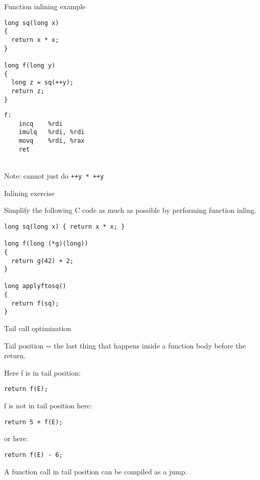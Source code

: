 \documentclass[landscape]{beamer}
\begin{document}
\begin{frame}[fragile]{Function inlining example}
\begin{minipage}{.5\textwidth}
\begin{verbatim}
long sq(long x)
{
  return x * x;
}

long f(long y)
{
  long z = sq(++y);
  return z;
}
\end{verbatim}
\end{minipage}
%
\begin{minipage}{.4\textwidth}
\begin{verbatim}
f:                   
	incq	%rdi
	imulq	%rdi, %rdi
	movq	%rdi, %rax
	ret
\end{verbatim}
\end{minipage}
\\[2em]

Note: cannot just do \texttt{++y * ++y}
\end{frame}

\begin{frame}[fragile]{Inlining exercise}

Simplify the following C code as much as possible by performing function inling.

\begin{verbatim}
long sq(long x) { return x * x; }

long f(long (*g)(long))
{
  return g(42) + 2;
}

long applyftosq()
{
  return f(sq);
}
\end{verbatim}

\end{frame}


\begin{frame}[fragile]{Tail call optimization}

Tail position = the last thing that happens inside a function body before the return.


Here f is in tail position:
\begin{verbatim}
return f(E);
\end{verbatim}
f is not in tail position here:
\begin{verbatim}
return 5 + f(E);
\end{verbatim}
or here:
\begin{verbatim}
return f(E) - 6;
\end{verbatim}
A function call in tail position can be compiled as a jump.

\end{frame}
\end{document}
